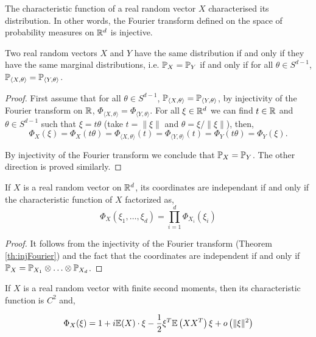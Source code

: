 \documentclass{article}
\begin{document}
\begin{theorem} \label{th:injFourier}
  The characteristic function of a real random vector $X$ characterised its
  distribution. In other words, the Fourier transform defined on the space of
  probability measures on $\Rd$ is injective. 
\end{theorem}

\begin{corollary}
  Two real random vectors $X$ and $Y$ have the same distribution if and only if
  they have the same marginal distributions, i.e. $\P_X = \P_Y$ if and
  only if for all $\theta \in S^{d-1}$, $\P_{\langle X,\theta \rangle} = \P_{\langle Y,\theta \rangle}$.
\end{corollary}

\begin{proof}

  First assume that for all $\theta \in S^{d-1}$, $\P_{\langle X,\theta \rangle}
  = \P_{\langle Y,\theta \rangle}$, by injectivity of the Fourier transform on $\R$,  $\Phi_{\langle X,\theta \rangle} = \Phi_{\langle
    Y,\theta \rangle}$. For all $\xi \in \Rd$ we can find $t \in \R$ and $\theta
  \in S^{d-1}$ such that $\xi = t \theta$ (take $t = \|\xi\|$ and $\theta =
  \xi/\|\xi\|$), then, $$\Phi_X(\xi) = \Phi_X(t\theta) = \Phi_{\langle X,\theta
    \rangle}(t) =  \Phi_{\langle Y,\theta
    \rangle}(t) =  \Phi_Y(t\theta) = \Phi_Y(\xi).$$

  By injectivity of the Fourier transform we conclude that $\P_X = \P_Y$. The
  other direction is proved similarly. 
\end{proof}

\begin{corollary}[Independence] \label{cor:independence}
  If $X$ is a real random vector on $\Rd$, its coordinates are independant if and only if
  the characteristic function of $X$ factorized as, 
  $$
  \Phi_{X}\left(\xi_{1}, \ldots, \xi_{d}\right)=\prod_{i=1}^{d} \Phi_{X_{i}}\left(\xi_{i}\right)
  $$
\end{corollary}

\begin{proof}
  It follows from the injectivity of the Fourier transform (Theorem
  \ref{th:injFourier}) and the fact that the coordinates are independent if and
  only if $\P_X = \P_{X_1}\otimes \ldots \otimes \P_{X_d}$.
\end{proof}

\begin{prop} \label{prop:charac}
  If $X$ is a real random vector with finite second moments, then its
  characteristic function is $C^2$ and,

  \begin{equation*}
    \Phi_{X}(\xi)=1 + i \E(X) \cdot \xi-\frac{1}{2} \xi^T \E\left(XX^T\right) \xi+o\left(\|\xi\|^{2}\right)
  \end{equation*}
  
\end{prop}
\end{document}
